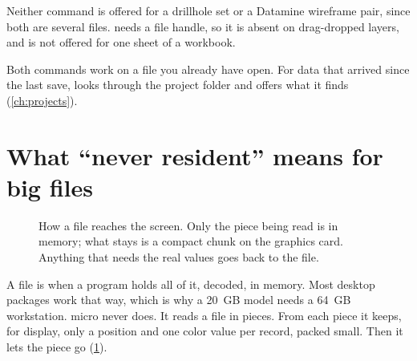 Neither command is offered for a drillhole set or a Datamine wireframe pair, since both are several files.  needs a file handle, so it is absent on drag-dropped layers, and  is not offered for one sheet of a workbook.

Both commands work on a file you already have open. For data that arrived since the last save,  looks through the project folder and offers what it finds (\cref{ch:projects}).

\section{What ``never resident'' means for big files}\label{sec:opening-resident}

\begin{figure}[htbp]\centering
{}
\caption{How a file reaches the screen. Only the piece being read is in memory; what stays is a compact chunk on the graphics card. Anything that needs the real values goes back to the file.}\label{fig:opening-stream}
\end{figure}

A file is  when a program holds all of it, decoded, in memory. Most desktop packages work that way, which is why a 20~GB model needs a 64~GB workstation. micro never does. It reads a file in pieces. From each piece it keeps, for display, only a position and one color value per record, packed small. Then it lets the piece go (\cref{fig:opening-stream}).


